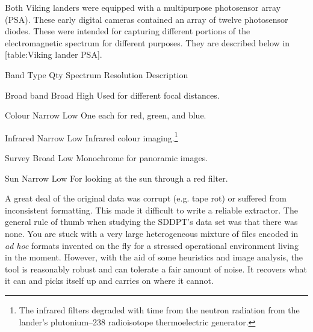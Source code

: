 Both Viking landers were equipped with a multipurpose photosensor array (PSA). These early digital cameras contained an array of twelve photosensor diodes. These were intended for capturing different portions of the electromagnetic spectrum for different purposes. They are described below in [table:Viking lander PSA].

{
    \bTABLE[split=repeat,option=stretch]
    \setupTABLE[column][5]
        [width=.43\textwidth,
        align=yes]
    \setupTABLE[row][each][align=center]
    \setupTABLE[4][1][align=center]

\bTABLEhead
    \bTR[bottomframe=on]
      \bTH  Band Type \eTH
      \bTH  Qty \eTH
      \bTH  Spectrum \eTH
      \bTH  Resolution \eTH
      \bTH  Description \eTH
    \eTR
\eTABLEhead

\bTABLEbody
    \bTR
      \bTC Broad band \eTC
       \eTC
      \bTC Broad \eTC
      \bTC High \eTC
      \bTC Used for different focal distances. \eTC
    \eTR

    \bTR
      \bTC Colour \eTC
       \eTC
      \bTC Narrow \eTC
      \bTC Low \eTC
      \bTC One each for red, green, and blue. \eTC
    \eTR

    \bTR
      \bTC Infrared \eTC
       \eTC
      \bTC Narrow \eTC
      \bTC Low \eTC
      \bTC Infrared colour imaging.\footnote{The infrared filters degraded with time from the neutron radiation from the lander's plutonium--238 radioisotope thermoelectric generator.} \eTC
    \eTR

    \bTR
      \bTC Survey \eTC
       \eTC
      \bTC Broad \eTC
      \bTC Low \eTC
      \bTC Monochrome for panoramic images. \eTC
    \eTR
    
    \bTR
      \bTC Sun \eTC
       \eTC
      \bTC Narrow \eTC
      \bTC Low \eTC
      \bTC For looking at the sun through a red filter. \eTC
    \eTR

\eTABLEbody

\eTABLE
}

A great deal of the original data was corrupt (e.g. tape rot) or suffered from inconsistent formatting. This made it difficult to write a reliable extractor. The general rule of thumb when studying the SDDPT's data set was that there was none. You are stuck with a very large heterogeneous mixture of files encoded in {\it ad hoc} formats invented on the fly for a stressed operational environment living in the moment. However, with the aid of some heuristics and image analysis, the tool is reasonably robust and can tolerate a fair amount of noise. It recovers what it can and picks itself up and carries on where it cannot.

